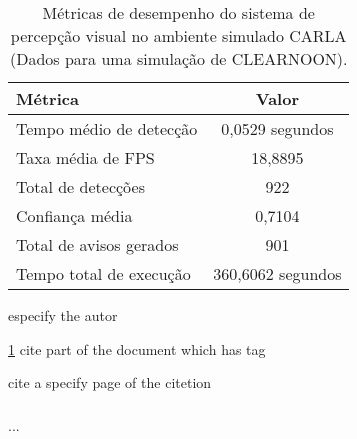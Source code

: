 
\begin{table}[H]
\centering
\begin{tabular}{|l|c|}
\hline
\textbf{Métrica} & \textbf{Valor} \\
\hline
Tempo médio de detecção & 0,0529 segundos \\
\hline
Taxa média de FPS & 18,8895 \\
\hline
Total de detecções & 922 \\
\hline
Confiança média & 0,7104 \\
\hline
Total de avisos gerados & 901 \\
\hline
Tempo total de execução & 360,6062 segundos \\
\hline
\end{tabular}
\caption{Métricas de desempenho do sistema de percepção visual no ambiente simulado CARLA (Dados para uma simulação de CLEARNOON).}
\label{tab:metricas_percepcao}
\end{table}


\citeonline{} especify the autor

\ref{} cite part of the document which has \label{} tag

\cite[p.~number]{} cite a specify page of the citetion

\subsection{}

\subsubsection{}

...

\chapter{}